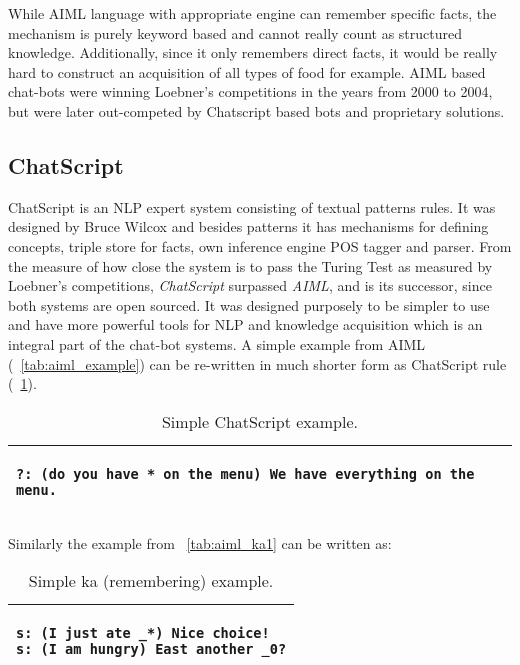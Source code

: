 While AIML language with appropriate engine can remember specific facts, the
mechanism is purely keyword based and cannot really count as structured knowledge. 
Additionally, since it only remembers direct facts, it would be
really hard to construct an acquisition of all types of food for example.
AIML based chat-bots were winning Loebner's competitions in the years from 2000
to 2004, but were later out-competed by Chatscript based bots and proprietary 
solutions.

\subsection {ChatScript}
\label{section:chatscript}
ChatScript is an NLP expert system consisting of textual patterns 
rules. It was designed by Bruce Wilcox \parencite{Wilcox2011} and besides
patterns it has mechanisms for defining concepts, triple store for facts, 
own inference engine POS tagger and parser. From the measure of how close 
the system is to pass the Turing Test as measured by Loebner's competitions, 
\emph{ChatScript} surpassed \emph{AIML},
and is its successor, since both systems are open sourced. It was designed 
purposely to be simpler to use and have more powerful tools for NLP and 
knowledge acquisition which is an integral part of the chat-bot systems. A simple example
from AIML (\tablename~\ref{tab:aiml_example}) can be re-written in much 
shorter form as ChatScript rule (\tablename~\ref{tab:chatscript_example}).

\begin{table}[H]
	\caption{Simple ChatScript example.}
	\label{tab:chatscript_example}
	\centering
	\begin{tabular}{l}
		\hline
		\lstset{breaklines=true}
		\begin{lstlisting}
?: (do you have * on the menu) We have everything on the menu.
		\end{lstlisting}  \\
		\hline
	\end{tabular}
\end{table}

Similarly the example from \tablename~\ref{tab:aiml_ka1} can be written as:
\begin{table}[H]
	\caption{Simple ka (remembering) example.}
	\label{tab:chatscript_ka1}
	\centering
	\begin{tabular}{l}
		\hline
		\lstset{breaklines=true}
		\begin{lstlisting}
s: (I just ate _*) Nice choice!
s: (I am hungry) East another _0?
		\end{lstlisting}  \\
		\hline
	\end{tabular}
\end{table}

